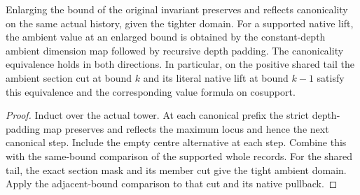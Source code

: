 \begin{theorem}
\label{hir:g1-supported-native-unequal-depth}
\leanok
Enlarging the bound of the original invariant preserves and
reflects canonicality on the same actual history, given the
tighter domain. For a supported native lift, the ambient value
at an enlarged bound is obtained by the constant-depth ambient
dimension map followed by recursive depth padding. The
canonicality equivalence holds in both directions. In particular,
on the positive shared tail the ambient section cut at bound
$k$ and its literal native lift at bound $k-1$ satisfy this
equivalence and the corresponding value formula on cosupport.
\end{theorem}
\begin{proof}
Induct over the actual tower. At each canonical prefix the
strict depth-padding map preserves and reflects the maximum
locus and hence the next canonical step. Include the empty
centre alternative at each step. Combine this with the
same-bound comparison of the supported whole records. For
the shared tail, the exact section mask and its member cut
give the tight ambient domain. Apply the adjacent-bound
comparison to that cut and its native pullback.
\end{proof}

